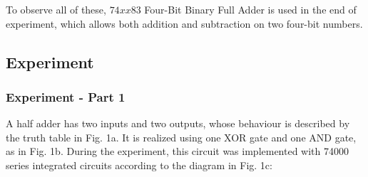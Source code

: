 \documentclass{article}
\begin{document}
To observe all of these, $74xx83$ Four-Bit Binary Full Adder is used in the end of experiment, which allows both addition and subtraction on two four-bit numbers.

\newpage

\subsection{Experiment}

\subsubsection{Experiment - Part 1}
A half adder has two inputs and two outputs, whose behaviour is described by the truth table in Fig. 1a. It is realized using one XOR gate and one AND gate, as in Fig. 1b. During the experiment, this circuit was implemented with 74000 series integrated circuits according to the diagram in Fig. 1c:
\end{document}
